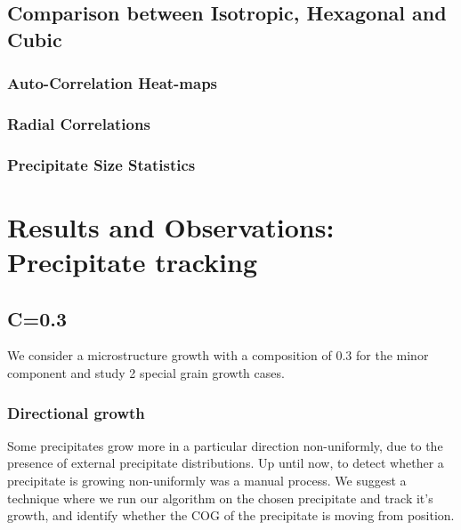 \documentclass[12pt, a4paper]{report}
\begin{document}
\section{Comparison between Isotropic, Hexagonal and Cubic}
\subsection{Auto-Correlation Heat-maps}


\subsection{Radial Correlations}


\subsection{Precipitate Size Statistics}

\chapter{Results and Observations: Precipitate tracking}

\section{C=0.3}
We consider a microstructure growth with a composition of 0.3 for the minor component and study 2 special grain growth cases.

\subsection{Directional growth}
Some precipitates grow more in a particular direction non-uniformly, due to the presence of external precipitate distributions. Up until now, to detect whether a precipitate is growing non-uniformly was a manual process. We suggest a technique where we run our algorithm on the chosen precipitate and track it's growth, and identify whether the COG of the precipitate is moving from position. 
\end{document}
